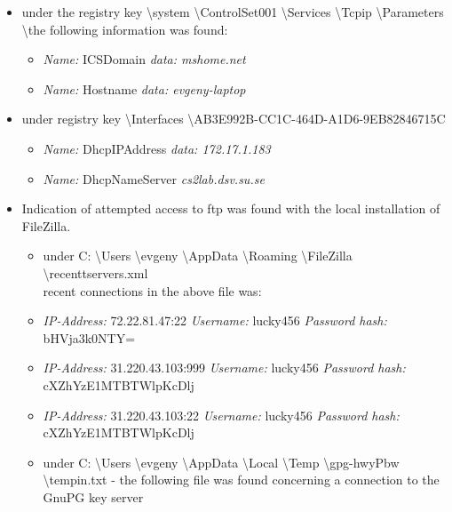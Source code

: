 \begin{enumerate}
\begin{itemize}
\begin{itemize}
\begin{itemize}
				\end{itemize}
				
		
		\item under the registry key \textbackslash system \textbackslash ControlSet001 \textbackslash Services \textbackslash Tcpip \textbackslash Parameters \textbackslash the following information was found:
			\begin{itemize}
				\item \textit{Name:} ICSDomain  \textit{data: mshome.net}
				\item \textit{Name:} Hostname  \textit{data: evgeny-laptop}
	
			\end{itemize}
			
			\item under registry key \textbackslash Interfaces \textbackslash \textbraceleft AB3E992B-CC1C-464D-A1D6-9EB82846715C \textbraceright
			
			\begin{itemize}
				\item \textit{Name:} DhcpIPAddress  \textit{data: 172.17.1.183}
				\item \textit{Name:} DhcpNameServer  \textit{cs2lab.dsv.su.se}
			\end{itemize}
			
		\item Indication of attempted access to ftp was found with the local installation of FileZilla.
			
			\begin{itemize}
				\item under C: \textbackslash Users \textbackslash evgeny \textbackslash AppData \textbackslash Roaming \textbackslash FileZilla \textbackslash recenttservers.xml \\
				recent connections in the above file was:
				\item \textit{IP-Address:} 72.22.81.47:22 \textit{Username:} lucky456 \textit{Password hash:} bHVja3k0NTY=
				\item \textit{IP-Address:} 31.220.43.103:999 \textit{Username:} lucky456 \textit{Password hash:} cXZhYzE1MTBTWlpKcDlj
				\item \textit{IP-Address:} 31.220.43.103:22 \textit{Username:} lucky456 \textit{Password hash:} cXZhYzE1MTBTWlpKcDlj\\
				
				\item under C: \textbackslash Users \textbackslash evgeny \textbackslash AppData \textbackslash Local \textbackslash Temp \textbackslash gpg-hwyPbw \textbackslash tempin.txt - the following file was found concerning a connection to the GnuPG key server\\
				

\end{itemize}
\end{itemize}
\end{itemize}
\end{enumerate}
